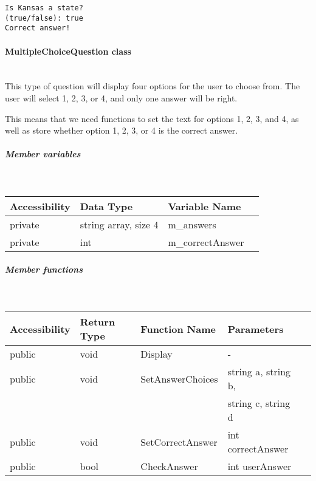 \documentclass[a4paper,12pt]{book}
\begin{document}
\begin{lstlisting}[style=output]
Is Kansas a state?
(true/false): true
Correct answer!
\end{lstlisting}

                    \newpage
                    \paragraph{ MultipleChoiceQuestion class } ~\\
                        This type of question will display four options
                        for the user to choose from. The user will select
                        1, 2, 3, or 4, and only one answer will be right.
                        
                        This means that we need functions to set the
                        text for options 1, 2, 3, and 4, as well as
                        store whether option 1, 2, 3, or 4 is the
                        correct answer.

                        \subparagraph{ Member variables } ~\\
                            
                            \begin{tabular}{ l l l l }
                                Accessibility & Data Type & Variable Name \\ \hline{}
                                private & string array, size 4 & m\_answers \\ \hline{}
                                private & int & m\_correctAnswer
                            \end{tabular}
                        
                        \subparagraph{ Member functions } ~\\

                            \begin{tabular}{ l l l l l }
                                Accessibility & Return Type & Function Name & Parameters  \\ \hline{}
                                public & void & Display & -  \\ \hline{}
                                public & void & SetAnswerChoices & string a, string b, \\
                                & & & string c, string d \\ \hline{}
                                public & void & SetCorrectAnswer & int correctAnswer \\ \hline{}
                                public & bool & CheckAnswer & int userAnswer
                            \end{tabular}
\end{document}
